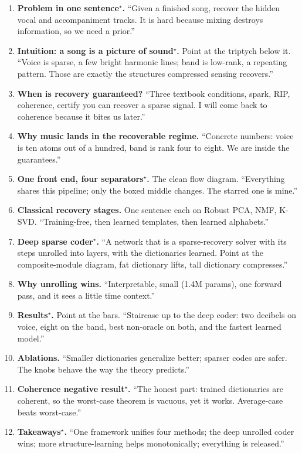 \documentclass[11pt]{article}
\begin{document}
\begin{enumerate}
\item \textbf{Problem in one sentence$^\star$.} ``Given a finished song, recover the
hidden vocal and accompaniment tracks. It is hard because mixing destroys
information, so we need a prior.''
\item \textbf{Intuition: a song is a picture of sound$^\star$.} Point at the
triptych below it. ``Voice is sparse, a few bright harmonic lines; band is
low-rank, a repeating pattern. Those are exactly the structures compressed sensing
recovers.''
\item \textbf{When is recovery guaranteed?} ``Three textbook conditions, spark, RIP,
coherence, certify you can recover a sparse signal. I will come back to coherence
because it bites us later.''
\item \textbf{Why music lands in the recoverable regime.} ``Concrete numbers: voice
is ten atoms out of a hundred, band is rank four to eight. We are inside the
guarantees.''
\item \textbf{One front end, four separators$^\star$.} The clean flow diagram.
``Everything shares this pipeline; only the boxed middle changes. The starred one is
mine.''
\item \textbf{Classical recovery stages.} One sentence each on Robust PCA, NMF,
K-SVD. ``Training-free, then learned templates, then learned alphabets.''
\item \textbf{Deep sparse coder$^\star$.} ``A network that is a sparse-recovery
solver with its steps unrolled into layers, with the dictionaries learned. Point at
the composite-module diagram, fat dictionary lifts, tall dictionary compresses.''
\item \textbf{Why unrolling wins.} ``Interpretable, small (1.4M params), one
forward pass, and it sees a little time context.''
\item \textbf{Results$^\star$.} Point at the bars. ``Staircase up to the deep coder:
two decibels on voice, eight on the band, best non-oracle on both, and the fastest
learned model.''
\item \textbf{Ablations.} ``Smaller dictionaries generalize better; sparser codes
are safer. The knobs behave the way the theory predicts.''
\item \textbf{Coherence negative result$^\star$.} ``The honest part: trained
dictionaries are coherent, so the worst-case theorem is vacuous, yet it works.
Average-case beats worst-case.''
\item \textbf{Takeaways$^\star$.} ``One framework unifies four methods; the deep
unrolled coder wins; more structure-learning helps monotonically; everything is
released.''
\end{enumerate}
\end{document}
